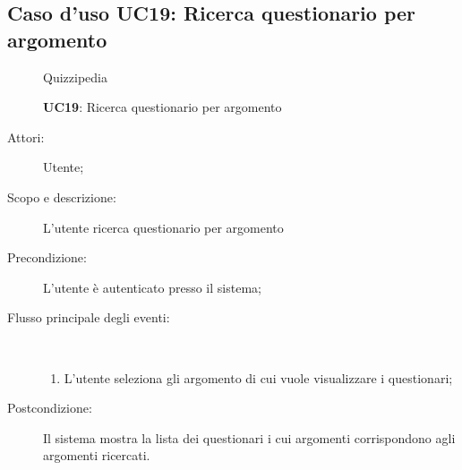\subsection{Caso d'uso UC19: Ricerca questionario per argomento}
	\begin{figure}[H]
		\centering
		\begin{resizedtikzpicture}{\textwidth}
		\begin{umlsystem}[x=0, fill=lightgray!20]{Quizzipedia}
		\end{umlsystem}
		\end{resizedtikzpicture}
		\caption{\textbf{UC19}: Ricerca questionario per argomento}
		\label{UC19}
	\end{figure}
\begin{description}
\item[Attori:] Utente;
\item[Scopo e descrizione:] L'utente ricerca questionario per argomento
      \item[Precondizione:] L'utente è autenticato presso il sistema;

        \item[Flusso principale degli eventi:] \ 
 \begin{enumerate}
          \item L'utente seleziona gli argomento di cui vuole visualizzare i questionari;

      \end{enumerate}
    \item[Postcondizione:] Il sistema mostra la lista dei questionari i cui argomenti corrispondono agli argomenti ricercati.
  \end{description}
\hypertarget{UC20}{}
